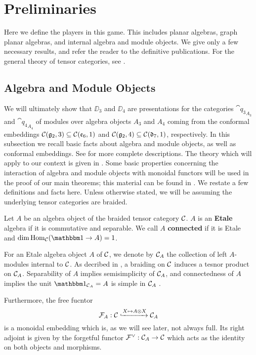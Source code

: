 \section{Preliminaries}\label{sec:prelim}
Here we define the players in this game. 
This includes planar algebras, graph planar algebras, and internal algebra and module objects.
We give only a few necessary results, and refer the reader to the definitive publications.
For the general theory of tensor categories, see \cite{EGNO}.



\subsection{Algebra and Module Objects}
We will ultimately show that $\DD_3$ and $\DD_4$ are presentations for the categories
$\cat{q_3}_{A_3}$ and $\cat{q_4}_{A_4}$ of modules over algebra objects $A_3$ and $A_4$ coming from the conformal embeddings 
$\mathcal{C}(\mathfrak{g}_2,3) \subseteq \mathcal{C}(\mathfrak{e}_6,1)$ and $\mathcal{C}(\mathfrak{g}_2,4) \subseteq \mathcal{C}(\mathfrak{d}_7,1)$, respectively. 
In this subsection we recall basic facts about algebra and module objects,
as well as conformal embeddings. 
See \cite{EGNO, ostrik2001modulecategoriesweakhopf} for more complete descriptions. 
The theory which will apply to our context is given in \cite{cain_noah}.
Some basic properties concerning the interaction of algebra and module objects with
monoidal functors will be used in the proof of our main theorems;
this material can be found in \cite{monoidalFunctorsAndAlgebras}.
We restate a few definitions and facts here.
Unless otherwise stated, we will be assuming the underlying tensor categories are braided.


\begin{definition}
    Let $A$ be an algebra object of the braided tensor category $\mathcal{C}$.
    $A$ is an {\bf Etale} algebra if it is commutative and separable.
    We call $A$ {\bf connected} if it is Etale and $\dim\Hom_\CC(\unit \to A)=1$.
\end{definition}


For an Etale algebra object $A$ of $\mathcal{C}$, we denote by $\mathcal{C}_A$ the collection of left $A$-modules internal to $\mathcal{C}$.
As decribed in \cite{cain_noah}, a braiding on $\mathcal{C}$ induces a tesnor product on $\mathcal{C}_A$.
Separability of $A$ implies semisimplicity of $\mathcal{C}_A$, 
and connectedness of $A$ implies the unit $\unit_{\CC_A}=A$ is simple in $\mathcal{C}_A$ \cite{DMNO}.

Furthermore, the free fucntor 
\[
    \mathcal{F}_A: \mathcal{C} \xhookrightarrow{X\mapsto A\otimes X} \mathcal{C}_A
\]
is a monoidal embedding which is, as we will see later, not always full.
Its right adjoint is given by the forgetful functor $\mathcal{F}^\vee:\mathcal{C}_A\to\mathcal{C}$ 
which acts as the identity on both objects and morphisms. 

